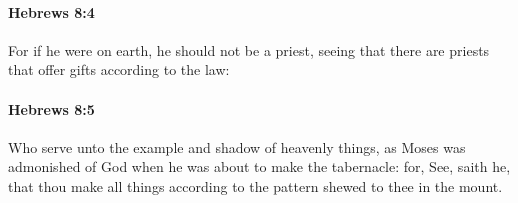 		\paragraph{Hebrews 8:4} %
			\label{HEBREWS-8-4}

			For if he were on earth, he should not be a priest, seeing that there are priests that offer gifts according to the law:

			\begin{framed}
			\scriptsize
				\begin{compactdesc}
					\item[SBLG] 
				\end{compactdesc}
			\end{framed}

		\paragraph{Hebrews 8:5} %
			\label{HEBREWS-8-5}

			Who serve unto the example and shadow of heavenly things, as Moses was admonished of God when he was about to make the tabernacle: for, See, saith he, that thou make all things according to the pattern shewed to thee in the mount.

